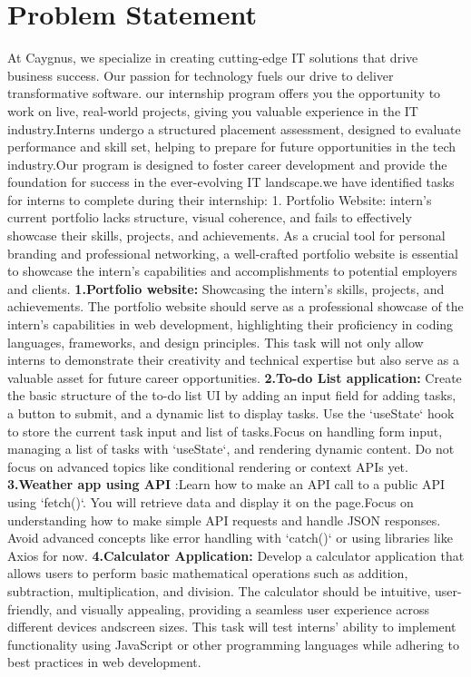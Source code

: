 \section{Problem Statement} At Caygnus, we specialize in creating cutting-edge IT solutions that drive business success. Our passion for technology fuels our drive to deliver transformative software. our internship program offers you the opportunity to work on live, real-world projects, giving you valuable experience in the IT industry.Interns undergo a structured placement assessment, designed to evaluate performance and skill set, helping to prepare for future opportunities in the tech industry.Our program is designed to foster career development and provide the foundation for success in the ever-evolving IT landscape.we have identified tasks for interns to complete during their internship:
1. Portfolio Website: intern’s current portfolio lacks structure, visual coherence, and fails to effectively showcase their skills, projects, and achievements. As a crucial tool for personal branding and professional networking, a well-crafted portfolio website is essential to showcase the intern’s capabilities and accomplishments to potential employers and clients.\bigskip
\newline \textbf{1.Portfolio website:} Showcasing the intern’s skills, projects, and achievements. The portfolio website should serve as a professional showcase of the intern’s capabilities in web development, highlighting their proficiency in coding languages, frameworks, and design principles. This task will not only allow interns to demonstrate their creativity and technical expertise but also serve as a valuable asset for future career opportunities.
\newline \textbf{2.To-do List application:}  Create the basic structure of the to-do list UI by adding an input field for adding tasks, a button to submit, and a dynamic list to display tasks. Use the `useState` hook to store the current task input and list of tasks.Focus on handling form input, managing a list of tasks with `useState`, and rendering dynamic content. Do not focus on advanced topics like conditional rendering or context APIs yet.\smallskip
\newline \textbf{3.Weather app using API} :Learn how to make an API call to a public API using `fetch()`. You will retrieve data and display it on the page.Focus on understanding how to make simple API requests and handle JSON responses. Avoid advanced concepts like error handling with `catch()` or using libraries like Axios for now.\smallskip
\newline \textbf{4.Calculator Application:}  Develop a calculator application that allows users to
perform basic mathematical operations such as addition, subtraction, multiplication, and division. The calculator should be intuitive, user-friendly, and visually appealing, providing a seamless user experience across different devices andscreen sizes. This task will test interns’ ability to implement functionality using JavaScript or other programming languages while adhering to best practices in web development. 
